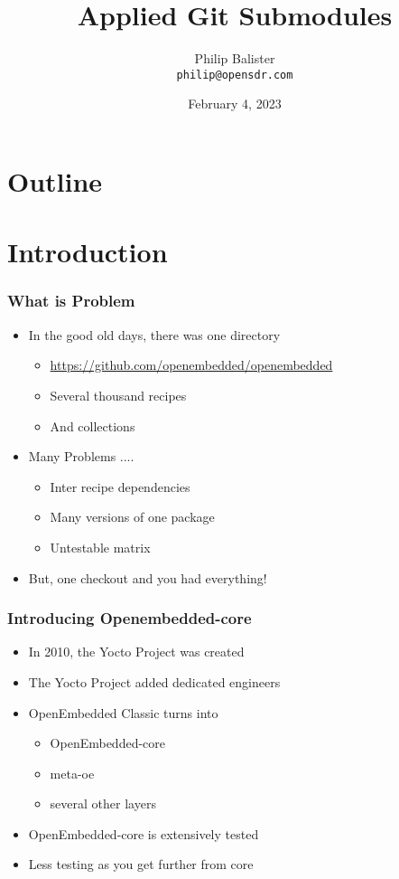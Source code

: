 \documentclass{beamer}
\title{Applied Git Submodules}
\institute{Open SDR}
\author{Philip Balister \\
\tt\tiny philip@opensdr.com}
\date{February 4, 2023}
\begin{document}
 

\begin{frame}
\titlepage
\end{frame}

\section*{Outline}

\begin{frame}
  \tableofcontents
\end{frame}

\section{Introduction}

\begin{frame}
\frametitle{What is Problem}

\begin{itemize}
\item In the good old days, there was one directory
	\begin{itemize}
		\item \url{https://github.com/openembedded/openembedded}
		\item{Several thousand recipes}
		\item{And collections}
	\end{itemize}
\item Many Problems ....
	\begin{itemize}
		\item Inter recipe dependencies
		\item Many versions of one package
		\item Untestable matrix
	\end{itemize}
\item But, one checkout and you had everything!
\end{itemize}

\end{frame}

\begin{frame}
\frametitle{Introducing Openembedded-core}

\begin{itemize}
\item In 2010, the Yocto Project was created
\item The Yocto Project added dedicated engineers
\item OpenEmbedded Classic turns into
	\begin{itemize}
			\item OpenEmbedded-core
			\item meta-oe
			\item several other layers
	\end{itemize}
\item OpenEmbedded-core is extensively tested
\item Less testing as you get further from core
\end{itemize}

\end{frame}
\end{document}
